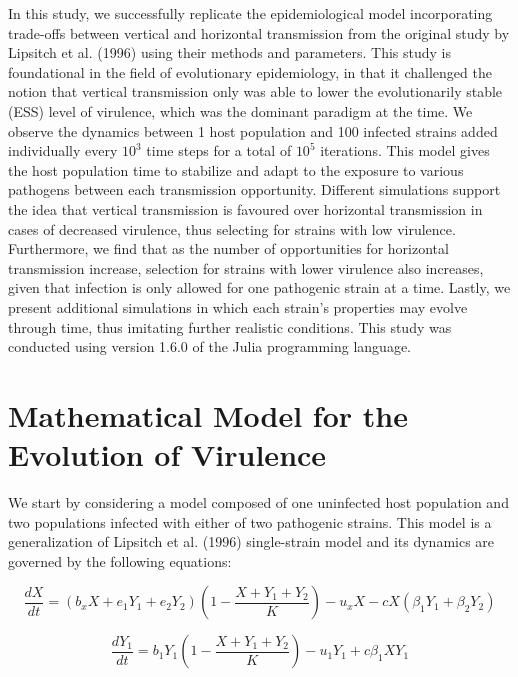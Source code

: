 In this study, we successfully replicate the epidemiological model incorporating
trade-offs between vertical and horizontal transmission from the original study
by Lipsitch et al. (1996)\supercite{Lipsitch:1996} using their methods and
parameters.
This study is foundational in the field of evolutionary epidemiology, in that
it challenged the notion that vertical transmission only was able to lower the
evolutionarily stable (ESS) level of virulence, which was the dominant paradigm
at the time.
We observe the dynamics between 1 host population and 100 infected strains added
individually every $10^3$ time steps for a total of $10^5$ iterations.
This model gives the host population time to stabilize and adapt to the exposure
to various pathogens between each transmission opportunity.
Different simulations support the idea that vertical transmission is favoured
over horizontal transmission in cases of decreased virulence, thus selecting
for strains with low virulence.
Furthermore, we find that as the number of opportunities for horizontal
transmission increase, selection for strains with lower virulence also increases,
given that infection is only allowed for one pathogenic strain at a time.
Lastly, we present additional simulations in which each strain’s properties may
evolve through time, thus imitating further realistic conditions.
This study was conducted using version 1.6.0 of the Julia programming language.

\section{Mathematical Model for the Evolution of Virulence}

We start by considering a model composed of one uninfected host population and
two populations infected with either of two pathogenic strains. This model is a
generalization of Lipsitch et al. (1996)\supercite{Lipsitch:1996} single-strain
model and its dynamics are governed by the following equations:

\begin{equation}
\frac{dX}{dt} = (b_x X + e_1 Y_1 + e_2 Y_2)(1 - \frac{X + Y_1 + Y_2}{K}) - u_x X - c X(\beta_1 Y_1 + \beta_2 Y_2)
\label{eqn:1}
\end{equation}

\begin{equation}
\frac{dY_1}{dt} = b_1 Y_1(1 - \frac{X + Y_1 + Y_2}{K}) - u_1 Y_1 + c\beta_1 X Y_1
\label{eqn:2}
\end{equation}

